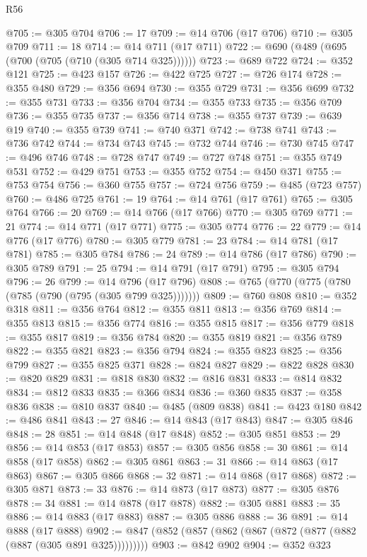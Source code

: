 \begin{lexlean}{R56}
\begin{coremodule}
@705 := @305 @704
@706 := 17
@709 := @14 @706 (@17 @706)
@710 := @305 @709
@711 := 18
@714 := @14 @711 (@17 @711)
@722 := @690 (@489 (@695 (@700 (@705 (@710 (@305 @714 @325))))))
@723 := @689 @722
@724 := @352 @121
@725 := @423 @157
@726 := @422 @725
@727 := @726 @174
@728 := @355 @480
@729 := @356 @694
@730 := @355 @729
@731 := @356 @699
@732 := @355 @731
@733 := @356 @704
@734 := @355 @733
@735 := @356 @709
@736 := @355 @735
@737 := @356 @714
@738 := @355 @737
@739 := @639 @19
@740 := @355 @739
@741 := @740 @371
@742 := @738 @741
@743 := @736 @742
@744 := @734 @743
@745 := @732 @744
@746 := @730 @745
@747 := @496 @746
@748 := @728 @747
@749 := @727 @748
@751 := @355 @749 @531
@752 := @429 @751
@753 := @355 @752
@754 := @450 @371
@755 := @753 @754
@756 := @360 @755
@757 := @724 @756
@759 := @485 (@723 @757)
@760 := @486 @725
@761 := 19
@764 := @14 @761 (@17 @761)
@765 := @305 @764
@766 := 20
@769 := @14 @766 (@17 @766)
@770 := @305 @769
@771 := 21
@774 := @14 @771 (@17 @771)
@775 := @305 @774
@776 := 22
@779 := @14 @776 (@17 @776)
@780 := @305 @779
@781 := 23
@784 := @14 @781 (@17 @781)
@785 := @305 @784
@786 := 24
@789 := @14 @786 (@17 @786)
@790 := @305 @789
@791 := 25
@794 := @14 @791 (@17 @791)
@795 := @305 @794
@796 := 26
@799 := @14 @796 (@17 @796)
@808 := @765 (@770 (@775 (@780 (@785 (@790 (@795 (@305 @799 @325)))))))
@809 := @760 @808
@810 := @352 @318
@811 := @356 @764
@812 := @355 @811
@813 := @356 @769
@814 := @355 @813
@815 := @356 @774
@816 := @355 @815
@817 := @356 @779
@818 := @355 @817
@819 := @356 @784
@820 := @355 @819
@821 := @356 @789
@822 := @355 @821
@823 := @356 @794
@824 := @355 @823
@825 := @356 @799
@827 := @355 @825 @371
@828 := @824 @827
@829 := @822 @828
@830 := @820 @829
@831 := @818 @830
@832 := @816 @831
@833 := @814 @832
@834 := @812 @833
@835 := @366 @834
@836 := @360 @835
@837 := @358 @836
@838 := @810 @837
@840 := @485 (@809 @838)
@841 := @423 @180
@842 := @486 @841
@843 := 27
@846 := @14 @843 (@17 @843)
@847 := @305 @846
@848 := 28
@851 := @14 @848 (@17 @848)
@852 := @305 @851
@853 := 29
@856 := @14 @853 (@17 @853)
@857 := @305 @856
@858 := 30
@861 := @14 @858 (@17 @858)
@862 := @305 @861
@863 := 31
@866 := @14 @863 (@17 @863)
@867 := @305 @866
@868 := 32
@871 := @14 @868 (@17 @868)
@872 := @305 @871
@873 := 33
@876 := @14 @873 (@17 @873)
@877 := @305 @876
@878 := 34
@881 := @14 @878 (@17 @878)
@882 := @305 @881
@883 := 35
@886 := @14 @883 (@17 @883)
@887 := @305 @886
@888 := 36
@891 := @14 @888 (@17 @888)
@902 := @847 (@852 (@857 (@862 (@867 (@872 (@877 (@882 (@887 (@305 @891 @325)))))))))
@903 := @842 @902
@904 := @352 @323

\end{coremodule}
\end{lexlean}
